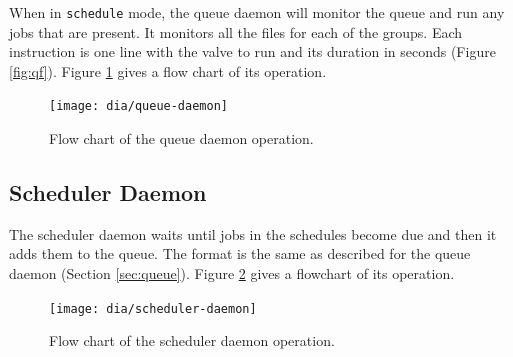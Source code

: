 \documentclass{article}
\begin{document}
When in \verb+schedule+ mode, the queue daemon will monitor the queue
and run any jobs that are present.
It monitors all the files for each of the groups.
Each instruction is one line with the valve to run and its duration
in seconds (Figure \ref{fig:qf}).
Figure \ref{fig:queue-daemon} gives a flow chart of its operation.

\begin{figure}[htbp!]
\begin{center}
\texttt{[image: dia/queue-daemon]}
\end{center}
\caption{Flow chart of the queue daemon operation.}
\label{fig:queue-daemon}
\end{figure}


\clearpage
\FloatBarrier
\subsection{Scheduler Daemon}

The scheduler daemon waits until jobs in the schedules
become due and then it adds them to the queue.
The format is the same as described for the queue
daemon (Section \ref{sec:queue}).
Figure \ref{fig:scheduler-daemon} gives a flowchart of its operation.

\begin{figure}[htbp!]
\begin{center}
\texttt{[image: dia/scheduler-daemon]}
\end{center}
\caption{Flow chart of the scheduler daemon operation.}
\label{fig:scheduler-daemon}
\end{figure}


\pagebreak
\glsaddall
\printglossaries

\clearpage
\printbibliography[heading=bibintoc]
\end{document}
